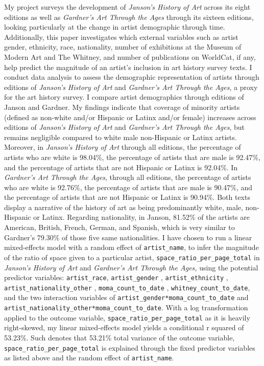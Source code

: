 \documentclass[
  letterpaper,
  DIV=11,
  numbers=noendperiod]{scrreprt}
\begin{document}
My project surveys the development of \emph{Janson's History of Art}
across its eight editions as well as \emph{Gardner's Art Through the
Ages} through its sixteen editions, looking particularly at the change
in artist demographic through time. Additionally, this paper
investigates which external variables such as artist gender, ethnicity,
race, nationality, number of exhibitions at the Museum of Modern Art and
The Whitney, and number of publications on WorldCat, if any, help
predict the magnitude of an artist's inclusion in art history survey
texts. I conduct data analysis to assess the demographic representation
of artists through editions of \emph{Janson's History of Art} and
\emph{Gardner's Art Through the Ages}, a proxy for the art history
survey. I compare artist demographics through editions of Janson and
Gardner. My findings indicate that coverage of minority artists (defined
as non-white and/or Hispanic or Latinx and/or female) increases across
editions of \emph{Janson's History of Art} and \emph{Gardner's Art
Through the Ages}, but remains negligible compared to white male
non-Hispanic or Latinx artists. Moreover, in \emph{Janson's History of
Art} through all editions, the percentage of artists who are white is
98.04\%, the percentage of artists that are male is 92.47\%, and the
percentage of artists that are not Hispanic or Latinx is 92.04\%. In
\emph{Gardner's Art Through the Ages}, through all editions, the
percentage of artists who are white is 92.76\%, the percentage of
artists that are male is 90.47\%, and the percentage of artists that are
not Hispanic or Latinx is 90.94\%. Both texts display a narrative of the
history of art as being predominantly white, male, non-Hispanic or
Latinx. Regarding nationality, in Janson, 81.52\% of the artists are
American, British, French, German, and Spanish, which is very similar to
Gardner's 79.30\% of those five same nationalities. I have chosen to run
a linear mixed-effects model with a random effect of
\texttt{artist\_name}, to infer the magnitude of the ratio of space
given to a particular artist, \texttt{space\_ratio\_per\_page\_total} in
\emph{Janson's History of Art} and \emph{Gardner's Art Through the
Ages,} using the potential predictor variables: \texttt{artist\_race},
\texttt{artist\_gender} , \texttt{artist\_ethnicity} ,
\texttt{artist\_nationality\_other} , \texttt{moma\_count\_to\_date} ,
\texttt{whitney\_count\_to\_date}, and the two interaction variables of
\texttt{artist\_gender*moma\_count\_to\_date} and
\texttt{artist\_nationality\_other*moma\_count\_to\_date}. With a log
transformation applied to the outcome variable,
\texttt{space\_ratio\_per\_page\_total} as it is heavily right-skewed,
my linear mixed-effects model yields a conditional r squared of 53.23\%.
Such denotes that 53.21\% total variance of the outcome variable,
\texttt{space\_ratio\_per\_page\_total} is explained through the fixed
predictor variables as listed above and the random effect of
\texttt{artist\_name}.
\end{document}
